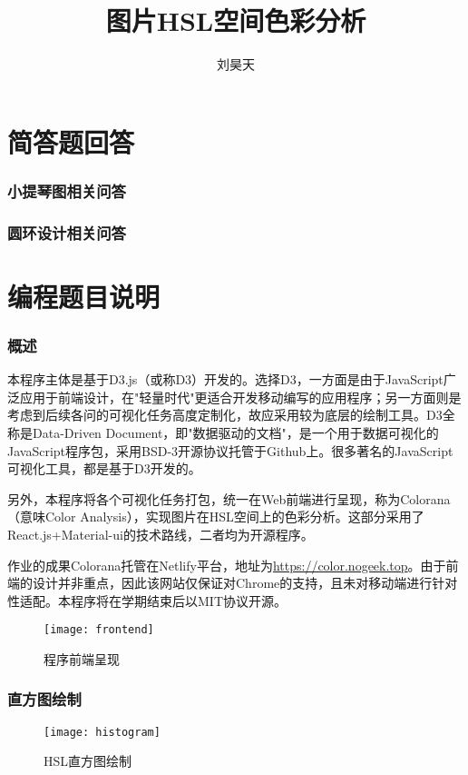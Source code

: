 \documentclass[a4paper,12pt]{article}
\title{图片HSL空间色彩分析}
\author{刘昊天}
\begin{document}
    \maketitle
    \part{简答题回答}
    \section{小提琴图相关问答}
    \section{圆环设计相关问答}
    \part{编程题目说明}
    \section{概述}
    本程序主体是基于D3.js（或称D3）开发的。选择D3，一方面是由于JavaScript广泛应用于前端设计，在"轻量时代"更适合开发移动编写的应用程序；另一方面则是考虑到后续各问的可视化任务高度定制化，故应采用较为底层的绘制工具。D3全称是Data-Driven Document，即"数据驱动的文档"，是一个用于数据可视化的JavaScript程序包，采用BSD-3开源协议托管于Github上。很多著名的JavaScript可视化工具，都是基于D3开发的。

    另外，本程序将各个可视化任务打包，统一在Web前端进行呈现，称为Colorana（意味Color Analysis），实现图片在HSL空间上的色彩分析。这部分采用了React.js+Material-ui的技术路线，二者均为开源程序。

    作业的成果Colorana托管在Netlify平台，地址为\url{https://color.nogeek.top}。由于前端的设计并非重点，因此该网站仅保证对Chrome的支持，且未对移动端进行针对性适配。本程序将在学期结束后以MIT协议开源。

    \begin{figure}[htbp]
      \centering
      \texttt{[image: frontend]}
      \caption{程序前端呈现}
      \label{fig:frontend}
    \end{figure}
    \section{直方图绘制}
    \begin{figure}[htbp]
      \centering
      \texttt{[image: histogram]}
      \caption{HSL直方图绘制}
      \label{fig:histogram}
    \end{figure}
\end{document}
